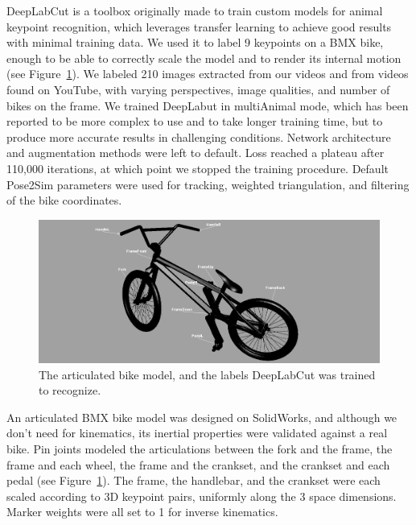 DeepLabCut \cite{Mathis2018, Lauer2022} is a toolbox originally made to train custom models for animal keypoint recognition, which leverages transfer learning to achieve good results with minimal training data. We used it to label 9 keypoints on a BMX bike, enough to be able to correctly scale the model and to render its internal motion (see Figure~\ref{fig_bikemodel}). We labeled 210 images extracted from our videos and from videos found on YouTube, with varying perspectives, image qualities, and number of bikes on the frame. We trained DeepLabut in multiAnimal mode, which has been reported to be more complex to use and to take longer training time, but to produce more accurate results in challenging conditions. Network architecture and augmentation methods were left to default. Loss reached a plateau after 110,000 iterations, at which point we stopped the training procedure. Default Pose2Sim parameters were used for tracking, weighted triangulation, and filtering of the bike coordinates. 

\begin{figure}[hbtp]
	\centering
	\def\svgwidth{1\columnwidth}
	\fontsize{10pt}{10pt}\selectfont
	\includegraphics[width=\linewidth]{"../Chap7/Figures/Bike_keypoints.PNG"}
	\caption{The articulated bike model, and the labels DeepLabCut was trained to recognize.}
	\label{fig_bikemodel}
\end{figure}

An articulated BMX bike model was designed on SolidWorks, and although we don't need for kinematics, its inertial properties were validated against a real bike. Pin joints modeled the articulations between the fork and the frame, the frame and each wheel, the frame and the crankset, and the crankset and each pedal (see Figure~\ref{fig_bikemodel}). The frame, the handlebar, and the crankset were each scaled according to 3D keypoint pairs, uniformly along the 3 space dimensions. Marker weights were all set to 1 for inverse kinematics. 


